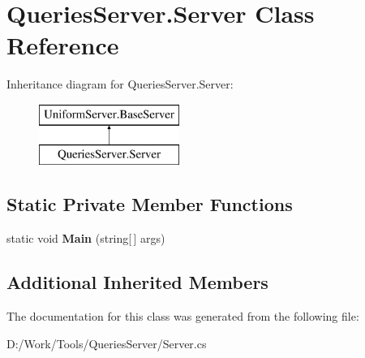 \hypertarget{class_queries_server_1_1_server}{}\section{Queries\+Server.\+Server Class Reference}
\label{class_queries_server_1_1_server}
Inheritance diagram for Queries\+Server.\+Server\+:\begin{figure}[H]
\begin{center}
\leavevmode
\includegraphics[height=2.000000cm]{d2/d9a/class_queries_server_1_1_server}
\end{center}
\end{figure}
\subsection*{Static Private Member Functions}
\begin{DoxyCompactItemize}
\item 
\mbox{\label{class_queries_server_1_1_server_ae294b75511557ef0701455c0e2ba785d}} 
static void {\bfseries Main} (string\mbox{[}$\,$\mbox{]} args)
\end{DoxyCompactItemize}
\subsection*{Additional Inherited Members}


The documentation for this class was generated from the following file\+:\begin{DoxyCompactItemize}
\item 
D\+:/\+Work/\+Tools/\+Queries\+Server/Server.\+cs\end{DoxyCompactItemize}
